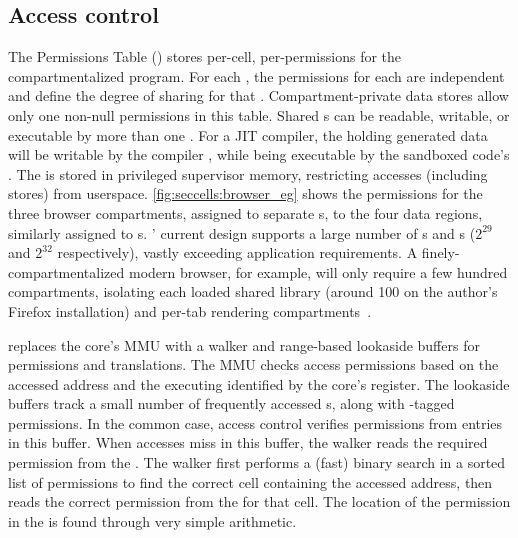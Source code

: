 \subsection{Access control}
\label{sec:seccells:design:access_ctl}
The Permissions Table (\ptable) stores 
per-cell, per-\secdiv permissions for the compartmentalized 
program.
For each \cell, the permissions for each \secdiv are independent
and define the degree of sharing for that \cell.
Compartment-private data stores allow only one \secdiv non-null 
permissions in this table.
Shared \cell{}s can be readable, writable, or executable by more than one
\secdiv.
For a JIT compiler, the \cell holding generated data will be writable
by the compiler \secdiv, while being executable by the sandboxed code's
\secdiv.
The \ptable is stored in privileged supervisor memory, restricting
accesses (including stores) from userspace.
\autoref{fig:seccells:browser_eg} shows the permissions for the three browser 
compartments, assigned to separate \secdiv{}s, to the four 
data regions, similarly assigned to \cell{}s.
\seccells' current \ptable design supports a large number of 
\secdiv{}s and \cell{}s ($2^{29}$ and $2^{32}$ respectively), 
vastly exceeding application requirements.
A finely-compartmentalized modern browser, for example, will only require
a few hundred compartments, isolating each loaded shared 
library (around 100 on the author's Firefox installation)
and per-tab rendering compartments~\cite{barth2008security}.

\seccells replaces the core's MMU with a \ptable walker and 
range-based lookaside buffers for permissions and translations.
The MMU checks access permissions based on the accessed address and
the executing \secdiv identified by the core's \sid register.
The lookaside buffers track a small number of frequently accessed
\cell{}s, along with \sid-tagged permissions.
In the common case, access control verifies permissions from
entries in this buffer.
When accesses miss in this buffer, the \ptable walker reads the
required permission from the \ptable.
The walker first performs a (fast) binary search in a sorted list of permissions
to find the correct cell containing the accessed address, then
reads the correct permission from the \ptable for that cell.
The location of the permission in the \ptable is found through very 
simple arithmetic.

